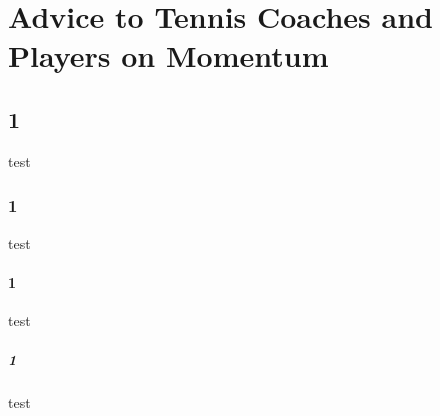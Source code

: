 \section{Advice to Tennis Coaches and Players on Momentum}

\cite{Alice14}

\cite{timmurphy.org2}

\subsection{1}
test
\subsubsection{1}
test
\paragraph{1}
test
\subparagraph{1}
test